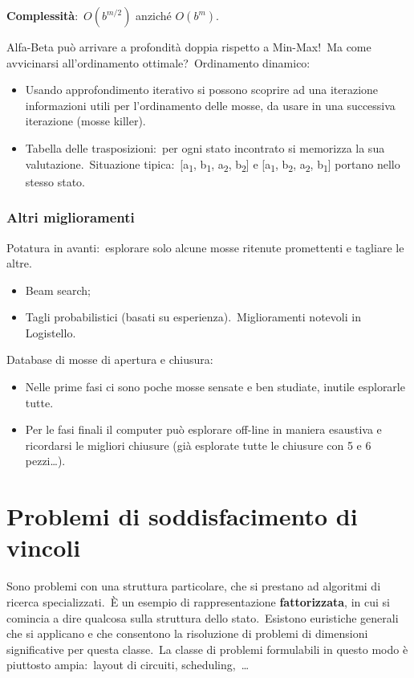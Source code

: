 \textbf{Complessità}:\ $O(b^{m/2})$ anziché $O(b^m)$.\

\noindent Alfa-Beta può arrivare a profondità doppia rispetto a Min-Max!\
Ma come avvicinarsi all'ordinamento ottimale?\
Ordinamento dinamico:

\begin{itemize}
	\item Usando approfondimento iterativo si possono scoprire ad una iterazione informazioni utili per l'ordinamento delle mosse, da usare in una successiva iterazione (mosse killer).
	\item Tabella delle trasposizioni:\ per ogni stato incontrato si memorizza la sua valutazione.\
	      Situazione tipica:\ [a\textsubscript{1}, b\textsubscript{1}, a\textsubscript{2}, b\textsubscript{2}] e [a\textsubscript{1}, b\textsubscript{2}, a\textsubscript{2}, b\textsubscript{1}] portano nello stesso stato.
\end{itemize}

\subsubsection{Altri miglioramenti}

Potatura in avanti:\ esplorare solo alcune mosse ritenute promettenti e tagliare le altre.
\begin{itemize}
	\item Beam search;
	\item Tagli probabilistici (basati su esperienza).\ Miglioramenti notevoli in Logistello.
\end{itemize}
Database di mosse di apertura e chiusura:
\begin{itemize}
	\item Nelle prime fasi ci sono poche mosse sensate e ben studiate, inutile esplorarle tutte.\
	\item Per le fasi finali il computer può esplorare off-line in maniera esaustiva e ricordarsi le migliori chiusure (già esplorate tutte le chiusure con 5 e 6 pezzi\dots).
\end{itemize}

\section{Problemi di soddisfacimento di vincoli}
Sono problemi con una struttura particolare, che si prestano ad algoritmi di ricerca specializzati.\
È un esempio di rappresentazione \textbf{fattorizzata}, in cui si comincia a dire qualcosa sulla struttura dello stato.\
Esistono euristiche generali che si applicano e che consentono la risoluzione di problemi di dimensioni significative per questa classe.\
La classe di problemi formulabili in questo modo è piuttosto ampia:\ layout di circuiti, scheduling,\ \dots

